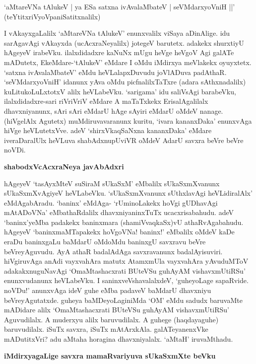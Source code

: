 \begin{shloka}
`aMtareVNa tAlukeV | ya ESa satxna ivAvalaMbateV | seVMdarxyoVniH ||'\\\label{page124}
\hfill{(teYtitxriVyoVpaniSatitxnalilx)}
\end{shloka}

I vAkayxgaLalilx `aMtareVNa tAlukeV' enunxvalilx viSaya aDinAlige. idu sarAgavAgi vAkayxda (ucAcxraNe\-yalilx) jotegeV barutetx. adakekx shurxtiyU hAgeyeV irabeVku. ilalxdidadxre kaNuNx mUgu heVge heVgoV\- Agi galATe mADutetx, EkeMdare-`tAlukeV' eMdare I oMdu iMdirxya meVlakekx oyuyxtetx. `satxna ivAva\-laMbateV' eMdu heVLalapxDuvudu joVlADuva padAthaR. `seVMdarxyoVniH' idanunx yAva oMdu picf\-nalilxTaTxre (adara sAthxnadalilx) kuLitukoLuLxtotxV alilx heVLabeVku. `sarigama' idu saliVsAgi barabeVku, ilalxdidadxre-sari riVriVriV eMdare A maTaTxkekx ErisalAgalilalx dhavxniyanunx, sAri sAri eMdarU hAge sAyiri eMdarU oMdeV nanage. (hiVgelAlx Agutetx) muMdiruvavaranunx kuritu, `ivara kananxDaka' enunx\-vAga hiVge heVLutetxVve. adeV `shirxVkaqSaNxna kananxDaka' eMdare iveraDaralUlx heVLuva shabAdxnupUviVR oMdeV AdarU savxra beVre beVre noVDi.

{\bigskip
\noindent
{\large\bf shabodxVcAcxraNeya javAbAdxri}}\label{page124}
\medskip

\noindent
hAgeyeV `tasAyxMteV suSiraM sUkaSxM' eMbalilx sUkaSxmXvanunx sUkaSxmXvAgiyeV heVLabeVku. `sUkaSxmX\-vanunx sUthxlavAgi heVLidiralAlx' 
eMdAgabAradu. `baninx' eMdAga- `rUminoLakekx hoVgi gUDha\-vAgi mAtA\-DoVNa' eMbathaRdalilx dhavxniyaninxTuTx ucacxrisabahudu. adeV `baninx'yeMba padakekx baninxmara (shamiV\-vaqkaSx)vU athaRvAgabahudu. hAgeyeV `baninxmaMTapakekx hoVgoVNa! baninx!' eMbalilx oMdeV kaDe eraDu baninxgaLu baMdarU oMdoMdu baninxgU savxravu beVre beVreyAguvudu. AyA athaR bada\-lAdAga savxravanunx badalAyisuviri. hiVgiruvAga anAdi vayxvahAra matutx AtamxmUla vayxvahAra yAvu\-duMToV adakakxnuguNavAgi `OmaMtashacxrati BUteVSu guhAyAM vishavxmUtiRSu'\label{125} enunxvudanunx heVLa\-beVku. I saninxveVshavalalxdeV, `guheyoLage sapaRvide. noVDu!' anunxvAga ideV guhe eMba padaveV baMdarU dhavxniyu beVreyAgutatxde. guheya baMDeyoLaginiMda `OM' eMdu sadudx baruvaMte mADi\-dare alilx `OmaMtashacxrati BUteVSu guhAyAM vishavxmUtiRSu' Aguvudilalx. A muderxyu alilx baruvu\-dilalx. A guhege (haqdayaguhe) baruvudilalx. iSuTx savxra, iSuTx mAtArxkAla. galATeyanenxVke mADutitxVri? adu aMtaha horagina dhavxniyalalx. `aMtaH' iruvaMthadu.

{\bigskip
\noindent
{\large\bf iMdirxyagaLige savxra mamaRvariyuva sUkaSxmXte beVku}}\label{page125}
\medskip

